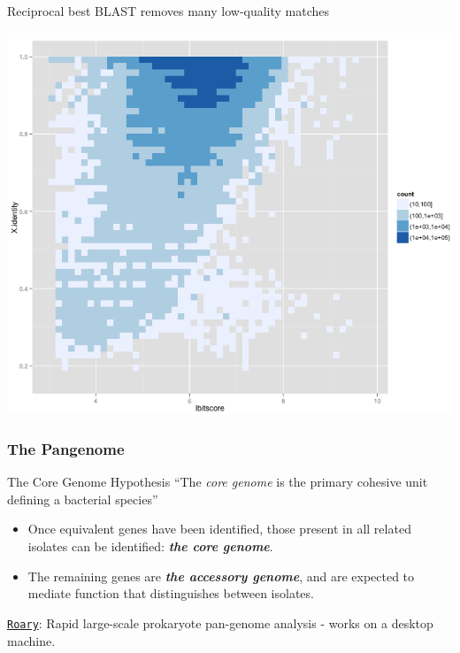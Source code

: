 \begin{frame}
\begin{block}{Reciprocal best BLAST removes many low-quality matches}
\begin{center}
      \includegraphics[height=0.33\textheight]{images/rbbh6}
    \end{center}
  \end{block}
\end{frame}

\begin{frame}
  \frametitle{The Pangenome}
  \begin{alertblock}{The Core Genome Hypothesis}
    ``The \textit{core genome} is the primary cohesive unit defining a bacterial species''
  \end{alertblock}
  \begin{itemize}
    \item \textcolor{hutton_green}{Once equivalent genes have been identified, those present in all related isolates can be identified: \textbf{\textit{the core genome}}.}
    \item \textcolor{hutton_blue}{The remaining genes are \textbf{\textit{the accessory genome}}, and are expected to mediate function that distinguishes between isolates.}
  \end{itemize}
  \textcolor{hutton_purple}{\href{https://github.com/sanger-pathogens/Roary}{\texttt{Roary}}}: Rapid large-scale prokaryote pan-genome analysis - works on a desktop machine.
\end{frame}

